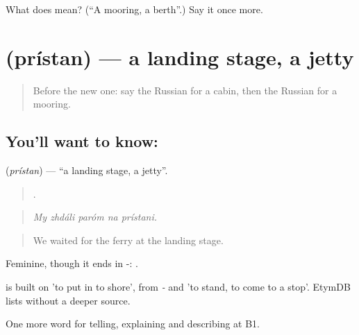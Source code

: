 \begin{tcolorbox}[breakable,colback=teal!4,colframe=teal!35!black,title={Before you move on}]
What does  mean? (\textquotedblleft{}A mooring, a berth\textquotedblright{}.) Say it once more.
\end{tcolorbox}
\section[\texorpdfstring{\ru{пристань} (prístan)}{пристань (prístan)}]{ (prístan) — a landing stage, a jetty}

\label{lesson:RU-C424-pristan}



\begin{quote}
Before the new one: say the Russian for a cabin, then the Russian for a mooring.
\end{quote}

\subsection*{You'll want to know: }
\textbf{} (\emph{prístan}) — \textquotedblleft{}a landing stage, a jetty\textquotedblright{}.

\begin{quote}
    .
\end{quote}

\begin{quote}
\emph{My zhdáli paróm na prístani.}
\end{quote}

\begin{quote}
We waited for the ferry at the landing stage.
\end{quote}

Feminine, though it ends in -: \emph{ }.

\begin{cousinweb}
\emph{} is built on \emph{} 'to put in to shore', from \emph{-} and \emph{} 'to stand, to come to a stop'. EtymDB lists \emph{} without a deeper source.
\end{cousinweb}

\begin{grammarlens}[title={What you've built}]
One more word for telling, explaining and describing at B1.
\end{grammarlens}

